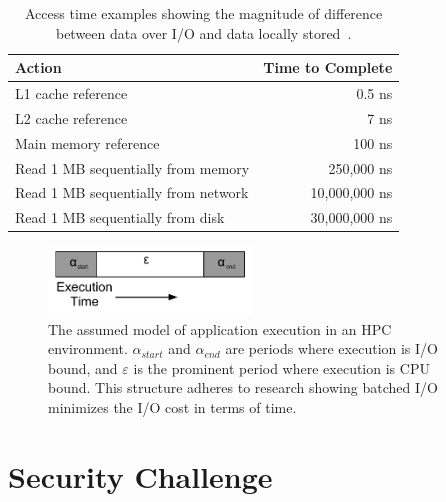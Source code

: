 \documentclass[oneside,12pt]{memoir}
\begin{document}
\begin{table}
	\begin{center}
	    \begin{tabular}{  l | r }
	    Action & Time to Complete \\ \hline
	    L1 cache reference & 0.5 ns  \\ 
	    L2 cache reference & 7 ns  \\
	    Main memory reference & 100 ns \\
	    Read 1 MB sequentially from memory & 250,000 ns  \\  
	    Read 1 MB sequentially from network & 10,000,000 ns \\ 
		Read 1 MB sequentially from disk & 30,000,000 ns \\
	    \end{tabular}
	\end{center}
	\caption{Access time examples showing the magnitude of difference between data over I/O and data locally stored~\cite{dean2009designs}.}
\end{table}

\begin{figure}
  \begin{center}
    \includegraphics[width=0.48\textwidth]{application_model.pdf}
  \end{center}
  \caption{The assumed model of application execution in an HPC environment. $\alpha_{start}$ and $\alpha_{end}$ are periods where execution is I/O bound, and $\varepsilon$ is the prominent period where execution is CPU bound. This structure adheres to research showing batched I/O minimizes the I/O cost in terms of time.}
\label{fig:application_model}
\end{figure}

\section{Security Challenge}
\end{document}
